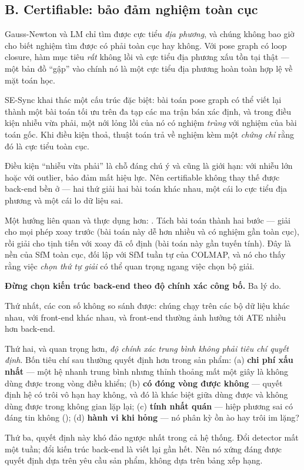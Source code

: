\documentclass[../../vslam.tex]{subfiles}
\begin{document}
\subsection{B. Certifiable: bảo đảm nghiệm toàn cục}

Gauss-Newton và LM chỉ tìm được cực tiểu \emph{địa phương}, và chúng không bao giờ cho biết nghiệm tìm được có phải toàn cục hay không. Với pose graph có loop closure, hàm mục tiêu \emph{rất} không lồi và cực tiểu địa phương xấu tồn tại thật --- một bản đồ ``gập'' vào chính nó là một cực tiểu địa phương hoàn toàn hợp lệ về mặt toán học.

SE-Sync \cite{rosen2019sesync} khai thác một cấu trúc đặc biệt: bài toán pose graph có thể viết lại thành một bài toán tối ưu trên đa tạp các ma trận bán xác định, và trong điều kiện nhiễu vừa phải, một nới lỏng lồi của nó có nghiệm \emph{trùng} với nghiệm của bài toán gốc. Khi điều kiện thoả, thuật toán trả về nghiệm kèm một \emph{chứng chỉ} rằng đó là cực tiểu toàn cục.

Điều kiện ``nhiễu vừa phải'' là chỗ đáng chú ý và cũng là giới hạn: với nhiễu lớn hoặc với outlier, bảo đảm mất hiệu lực. Nên certifiable không thay thế được back-end bền ở  --- hai thứ giải hai bài toán khác nhau, một cái lo cực tiểu địa phương và một cái lo dữ liệu sai.

Một hướng liên quan và thực dụng hơn:  \cite{hartley2013rotationaveraging}. Tách bài toán thành hai bước --- giải cho mọi phép xoay trước (bài toán này dễ hơn nhiều và có nghiệm gần toàn cục), rồi giải cho tịnh tiến với xoay đã cố định (bài toán này gần tuyến tính). Đây là nền của SfM toàn cục, đối lập với SfM tuần tự của COLMAP, và nó cho thấy rằng việc \emph{chọn thứ tự giải} có thể quan trọng ngang việc chọn bộ giải.

\begin{cambay}
\textbf{Đừng chọn kiến trúc back-end theo độ chính xác công bố.} Ba lý do.

Thứ nhất, các con số không so sánh được: chúng chạy trên các bộ dữ liệu khác nhau, với front-end khác nhau, và front-end thường ảnh hưởng tới ATE nhiều hơn back-end.

Thứ hai, và quan trọng hơn, \emph{độ chính xác trung bình không phải tiêu chí quyết định}. Bốn tiêu chí sau thường quyết định hơn trong sản phẩm: (a) \textbf{chi phí xấu nhất} --- một hệ nhanh trung bình nhưng thỉnh thoảng mất một giây là không dùng được trong vòng điều khiển; (b) \textbf{có đóng vòng được không} --- quyết định hệ có trôi vô hạn hay không, và đó là khác biệt giữa dùng được và không dùng được trong không gian lặp lại; (c) \textbf{tính nhất quán} --- hiệp phương sai có đáng tin không (); (d) \textbf{hành vi khi hỏng} --- nó phân kỳ ồn ào hay trôi im lặng?

Thứ ba, quyết định này khó đảo ngược nhất trong cả hệ thống. Đổi detector mất một tuần; đổi kiến trúc back-end là viết lại gần hết. Nên nó xứng đáng được quyết định dựa trên yêu cầu sản phẩm, không dựa trên bảng xếp hạng.
\end{cambay}
\end{document}
